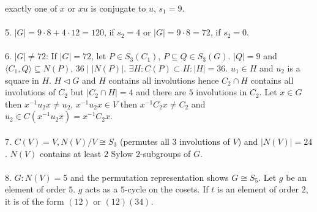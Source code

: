 exactly one of $x$  or $xu$ is
conjugate to $u$, $s_1 = 9$.
\\
\\
5.
$|G|= 9 \cdot 8 + 4 \cdot 12 = 120$, if $s_2=4$ or $|G|= 9 \cdot 8 = 72$, if $s_2 = 0$.
\\
\\
6. $|G| \ne 72$: If $|G|=72$, let
$P \in S_3(C_1)$, $P \subseteq Q \in S_3(G)$.  
$|Q|=9$ and $ \langle C_1 , Q \rangle \subseteq N(P)$,
$36 \mid |N(P)|$.
$\exists H: C(P) \subset H: |H|=36$.  $u_1 \in H$ and $u_2$ is a square in $H$.
$H \lhd G$ and $H$ contains all involutions hence $C_2 \cap H$ contains all involutions of
$C_2$ but $|C_2 \cap H|=4$ and there are $5$ involutions in $C_2$.
Let $x \in G$ then $x^{-1} u_2 x \ne u_2$, $x^{-1} u_2 x \in V$ then
$x^{-1} C_2 x \ne C_2$ and
$u_2 \in C(x^{-1} u_2 x) = x^{-1} C_2 x$.
\\
\\
7.  $C(V)=V, N(V)/V \cong S_3$ (permutes all $3$ involutions of $V$) and $|N(V)|= 24$.
$N(V)$ contains at least $2$ Sylow $2$-subgroups of $G$.
\\
\\
8. $G:N(V)= 5$ and the permutation representation shows $G \cong S_5$.  Let $g$ be an element
of order $5$.  $g$ acts as a $5$-cycle on the cosets.  If $t$ is an element of order $2$,
it is of the form $(12)$ or $(12)(34)$.
